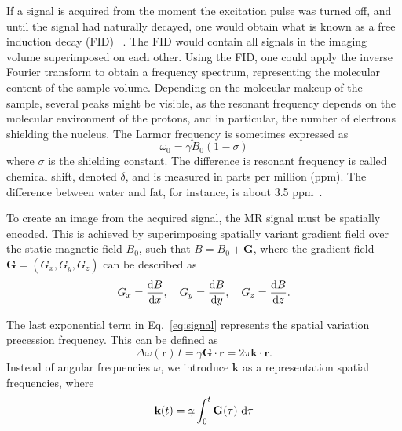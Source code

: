 If a signal is acquired from the moment the excitation pulse was turned off, and until the signal had naturally decayed, one would obtain what is known as a free induction decay (FID) ~\cite{Hahn1953}. The FID would contain all signals in the imaging volume superimposed on each other. Using the FID, one could apply the inverse Fourier transform to obtain a frequency spectrum, representing the molecular content of the sample volume. Depending on the molecular makeup of the sample, several peaks might be visible, as the resonant frequency depends on the molecular environment of the protons, and in particular, the number of electrons shielding the nucleus. The Larmor frequency is sometimes expressed as
\begin{equation}
    \omega_0 = \gamma B_0(1-\sigma)
    \label{eq:larmor_shield}
\end{equation}
where $\sigma$ is the shielding constant. The difference is resonant frequency is called chemical shift, denoted $\delta$, and is measured in parts per million (ppm). The difference between water and fat, for instance, is about 3.5 ppm~\cite{Harris2001}.

To create an image from the acquired signal, the MR signal must be spatially encoded. This is achieved by superimposing spatially variant gradient field over the static magnetic field $B_0$, such that $B = B_0 + \textbf{G}$, where the gradient field $\textbf{G} = (G_x,G_y,G_z)$ can be described as 
\begin{equation}
    G_x = \frac{\dif B}{\dif x}, \quad G_y = \frac{\dif B}{\dif y}, \quad G_z = \frac{\dif B}{\dif z}. 
\end{equation}

The last exponential term in Eq.~\ref{eq:signal} represents the spatial variation precession frequency. This can be defined as
\begin{equation}
    \Delta \omega(\textbf{r})\,t = \gamma\textbf{G}\cdot\textbf{r} = 2\pi\textbf{k}\cdot\textbf{r}.
\end{equation}
Instead of angular frequencies $\omega$, we introduce $\textbf{k}$ as a representation spatial frequencies, where
\begin{equation}
    \textbf{k}(t) = \gbar\int_0^t \textbf{G}(\tau)\,\dif\tau
\end{equation}

